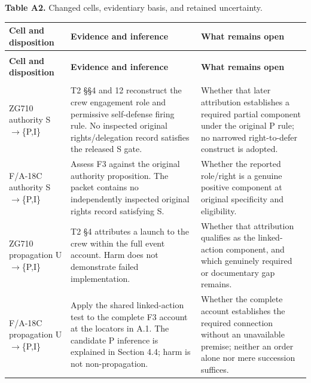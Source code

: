 \documentclass[11pt]{article}
\renewcommand{\arraystretch}{1.10}
\newlength{\TAETableWidth}
\begin{document}
\label{table-a2}
{\small \textcolor{TAENavy}{\textbf{Table A2.}} Changed cells, evidentiary basis, and retained uncertainty.\par}
\begingroup
\small
\setlength{\tabcolsep}{4pt}
\renewcommand{\arraystretch}{1.12}
\setlength{\TAETableWidth}{\dimexpr\linewidth-4\tabcolsep\relax}
\begin{longtable}{@{}>{\raggedright\arraybackslash}p{0.230\TAETableWidth}>{\raggedright\arraybackslash}p{0.400\TAETableWidth}>{\raggedright\arraybackslash}p{0.370\TAETableWidth}@{}}
\toprule
\rowcolor{TAEPaleNavy}
\textcolor{TAENavy}{\textbf{Cell and disposition}} & \textcolor{TAENavy}{\textbf{Evidence and inference}} & \textcolor{TAENavy}{\textbf{What remains open}} \\
\midrule
\endfirsthead
\multicolumn{3}{@{}l}{\footnotesize Table A2 (continued)}\\
\toprule
\rowcolor{TAEPaleNavy}
\textcolor{TAENavy}{\textbf{Cell and disposition}} & \textcolor{TAENavy}{\textbf{Evidence and inference}} & \textcolor{TAENavy}{\textbf{What remains open}} \\
\midrule
\endhead
\midrule
\multicolumn{3}{r@{}}{\footnotesize Continued on next page}\\
\endfoot
\bottomrule
\endlastfoot
ZG710 authority S\(\rightarrow\)\{P,I\} & T2 §§4 and 12 reconstruct the crew engagement role and permissive self-defense firing rule. No inspected original rights/delegation record satisfies the released S gate. & Whether that later attribution establishes a required partial component under the original P rule; no narrowed right-to-defer construct is adopted. \\
F/A-18C authority S\(\rightarrow\)\{P,I\} & Assess F3 against the original authority proposition. The packet contains no independently inspected original rights record satisfying S. & Whether the reported role/right is a genuine positive component at original specificity and eligibility. \\
ZG710 propagation U\(\rightarrow\)\{P,I\} & T2 §4 attributes a launch to the crew within the full event account. Harm does not demonstrate failed implementation. & Whether that attribution qualifies as the linked-action component, and which genuinely required or documentary gap remains. \\
F/A-18C propagation U\(\rightarrow\)\{P,I\} & Apply the shared linked-action test to the complete F3 account at the locators in A.1. The candidate P inference is explained in Section 4.4; harm is not non-propagation. & Whether the complete account establishes the required connection without an unavailable premise; neither an order alone nor mere succession suffices. \\

\end{longtable}
\end{document}
